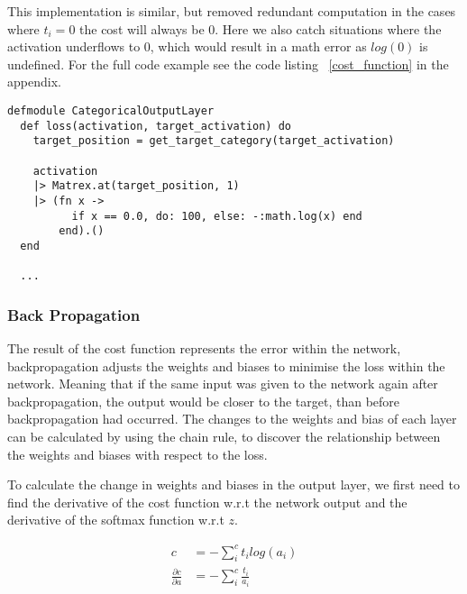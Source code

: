 This implementation is similar, but removed redundant computation in the cases
where \(t_{i} = 0\) the cost will always be 0. Here we also catch situations
where the activation underflows to 0, which would result in a math error as
\(log(0)\) is undefined. For the full code example see the code listing
~\ref{cost_function} in the appendix.
\begin{lstlisting}
defmodule CategoricalOutputLayer
  def loss(activation, target_activation) do
    target_position = get_target_category(target_activation)

    activation
    |> Matrex.at(target_position, 1)
    |> (fn x ->
          if x == 0.0, do: 100, else: -:math.log(x) end
        end).()
  end

  ...
\end{lstlisting}


\subsubsection{Back Propagation}
The result of the cost function represents the error within the network,
backpropagation adjusts the weights and biases to minimise the loss within the
network. Meaning that if the same input was given to the network again after
backpropagation, the output would be closer to the target, than before
backpropagation had occurred. The changes to the weights and bias of each layer
can be calculated by using the chain rule, to discover the relationship between
the weights and biases with respect to the loss.

To calculate the change in weights and biases in the output layer, we first need
to find the derivative of the cost function w.r.t the network output and the
derivative of the softmax function w.r.t \(z\).

\begin{equation}
    \begin{aligned}
        c &= - \sum_{i}^{c} t_{i}log(a_{i}) \\
        \frac{\partial c}{\partial a} &= - \sum_{i}^{c} \frac{t_{i}}{a_{i}}
    \end{aligned}
\end{equation}

